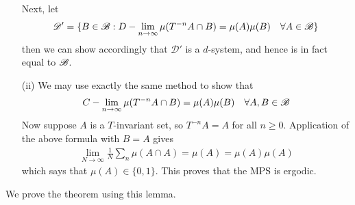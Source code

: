 \documentclass[10pt,a4paper]{report}
\newenvironment{proof}
{\begin{changemargin}{1cm}{0.5cm} 
	}%
	{\end{changemargin}
}
\begin{document}
\begin{proof}
\begin{itemize}
\quad Next, let 
\begin{align*}
\mathscr{D}' = \{B\in \mathscr{B} : D-\lim_{n\rightarrow \infty} \mu(T^{-n} A \cap B) = \mu(A) \mu(B) \quad \forall A\in \mathscr{B} \}
\end{align*}
then we can show accordingly that $\mathscr{D}'$ is a $d$-system, and hence is in fact equal to $\mathscr{B}$.
\item[(ii)] We may use exactly the same method to show that
\begin{align*}
C-\lim_{n\rightarrow \infty} \mu(T^{-n}A \cap B) = \mu(A) \mu(B) \quad \forall A,B \in \mathscr{B}
\end{align*}
Now suppose $A$ is a $T$-invariant set, so $T^{-n} A = A$ for all $n\geq 0$. Application of the above formula with $B=A$ gives
\begin{align*}
\lim_{N\rightarrow \infty} \frac{1}{N}\sum_{n}\mu(A \cap A) = \mu(A) = \mu(A)\mu(A)
\end{align*}
which says that $\mu(A) \in \{0,1\}$. This proves that the MPS is ergodic.
\end{itemize}
\eop
\end{proof}
\s

We prove the theorem using this lemma.
\end{document}
